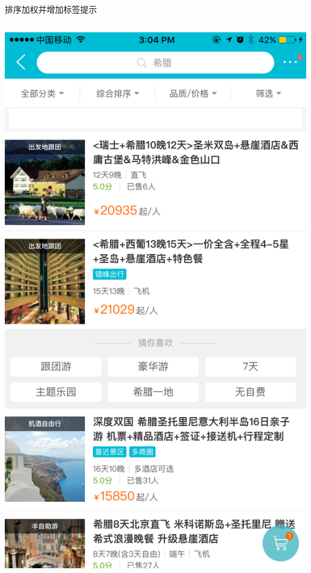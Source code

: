 \documentclass{beamer}
\begin{document}
\begin{CJK}{UTF8}{gbsn}
\begin{frame}{排序加权并增加标签提示}
\begin{columns}
\begin{column}{0.6\textwidth}
\begin{center}
        \includegraphics[scale=0.09]{./images/lables-demo.jpg}
      \end{center}
    \end{column}
  \end{columns}
\end{frame}


\end{CJK}
\end{document}
